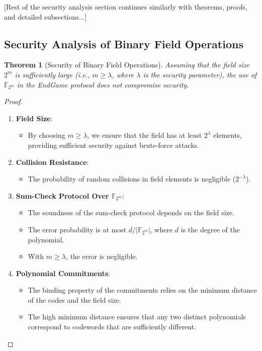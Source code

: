 \documentclass{article}
\theoremstyle{plain}
\newtheorem{theorem}{Theorem}[section]
\theoremstyle{definition}
\theoremstyle{remark}
\theoremstyle{problem}
\begin{document}
[Rest of the security analysis section continues similarly with theorems, proofs, and detailed subsections...]

\subsection{Security Analysis of Binary Field Operations}

\begin{theorem}[Security of Binary Field Operations]
\label{thm:binary-field-security}
Assuming that the field size \(2^m\) is sufficiently large (i.e., \(m \geq \lambda\), where \(\lambda\) is the security parameter), the use of \(\mathbb{F}_{2^m}\) in the EndGame protocol does not compromise security.
\end{theorem}

\begin{proof}
\begin{enumerate}
    \item \textbf{Field Size}:
    \begin{itemize}
        \item By choosing \(m \geq \lambda\), we ensure that the field has at least \(2^\lambda\) elements, providing sufficient security against brute-force attacks.
    \end{itemize}

    \item \textbf{Collision Resistance}:
    \begin{itemize}
        \item The probability of random collisions in field elements is negligible (\(2^{-\lambda}\)).
    \end{itemize}

    \item \textbf{Sum-Check Protocol Over \(\mathbb{F}_{2^m}\)}:
    \begin{itemize}
        \item The soundness of the sum-check protocol depends on the field size.
        \item The error probability is at most \(d / |\mathbb{F}_{2^m}|\), where \(d\) is the degree of the polynomial.
        \item With \(m \geq \lambda\), the error is negligible.
    \end{itemize}

    \item \textbf{Polynomial Commitments}:
    \begin{itemize}
        \item The binding property of the commitments relies on the minimum distance of the codes and the field size.
        \item The high minimum distance ensures that any two distinct polynomials correspond to codewords that are sufficiently different.
    \end{itemize}


\end{enumerate}
\end{proof}
\end{document}
